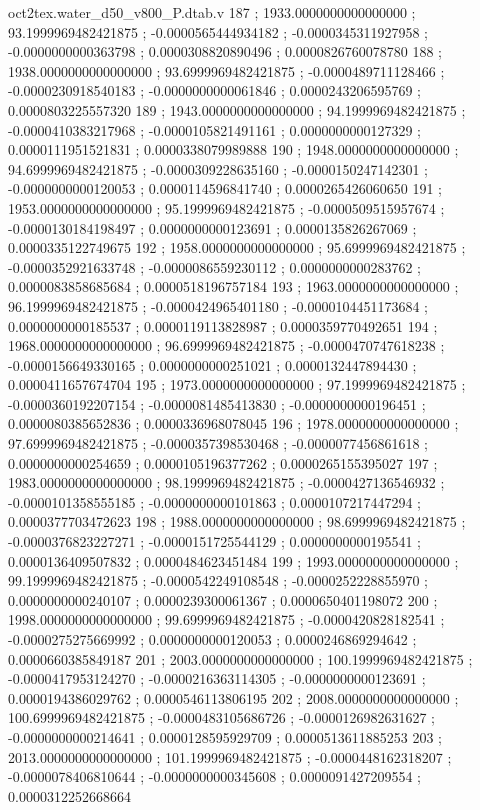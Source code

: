 \begin{filecontents}[overwrite]{oct2tex.water_d50_v800_P.dtab.v}
187 ; 1933.0000000000000000 ; 93.1999969482421875 ; -0.0000565444934182 ; -0.0000345311927958 ; -0.0000000000363798 ; 0.0000308820890496 ; 0.0000826760078780
188 ; 1938.0000000000000000 ; 93.6999969482421875 ; -0.0000489711128466 ; -0.0000230918540183 ; -0.0000000000061846 ; 0.0000243206595769 ; 0.0000803225557320
189 ; 1943.0000000000000000 ; 94.1999969482421875 ; -0.0000410383217968 ; -0.0000105821491161 ; 0.0000000000127329 ; 0.0000111951521831 ; 0.0000338079989888
190 ; 1948.0000000000000000 ; 94.6999969482421875 ; -0.0000309228635160 ; -0.0000150247142301 ; -0.0000000000120053 ; 0.0000114596841740 ; 0.0000265426060650
191 ; 1953.0000000000000000 ; 95.1999969482421875 ; -0.0000509515957674 ; -0.0000130184198497 ; 0.0000000000123691 ; 0.0000135826267069 ; 0.0000335122749675
192 ; 1958.0000000000000000 ; 95.6999969482421875 ; -0.0000352921633748 ; -0.0000086559230112 ; 0.0000000000283762 ; 0.0000083858685684 ; 0.0000518196757184
193 ; 1963.0000000000000000 ; 96.1999969482421875 ; -0.0000424965401180 ; -0.0000104451173684 ; 0.0000000000185537 ; 0.0000119113828987 ; 0.0000359770492651
194 ; 1968.0000000000000000 ; 96.6999969482421875 ; -0.0000470747618238 ; -0.0000156649330165 ; 0.0000000000251021 ; 0.0000132447894430 ; 0.0000411657674704
195 ; 1973.0000000000000000 ; 97.1999969482421875 ; -0.0000360192207154 ; -0.0000081485413830 ; -0.0000000000196451 ; 0.0000080385652836 ; 0.0000336968078045
196 ; 1978.0000000000000000 ; 97.6999969482421875 ; -0.0000357398530468 ; -0.0000077456861618 ; 0.0000000000254659 ; 0.0000105196377262 ; 0.0000265155395027
197 ; 1983.0000000000000000 ; 98.1999969482421875 ; -0.0000427136546932 ; -0.0000101358555185 ; -0.0000000000101863 ; 0.0000107217447294 ; 0.0000377703472623
198 ; 1988.0000000000000000 ; 98.6999969482421875 ; -0.0000376823227271 ; -0.0000151725544129 ; 0.0000000000195541 ; 0.0000136409507832 ; 0.0000484623451484
199 ; 1993.0000000000000000 ; 99.1999969482421875 ; -0.0000542249108548 ; -0.0000252228855970 ; 0.0000000000240107 ; 0.0000239300061367 ; 0.0000650401198072
200 ; 1998.0000000000000000 ; 99.6999969482421875 ; -0.0000420828182541 ; -0.0000275275669992 ; 0.0000000000120053 ; 0.0000246869294642 ; 0.0000660385849187
201 ; 2003.0000000000000000 ; 100.1999969482421875 ; -0.0000417953124270 ; -0.0000216363114305 ; -0.0000000000123691 ; 0.0000194386029762 ; 0.0000546113806195
202 ; 2008.0000000000000000 ; 100.6999969482421875 ; -0.0000483105686726 ; -0.0000126982631627 ; -0.0000000000214641 ; 0.0000128595929709 ; 0.0000513611885253
203 ; 2013.0000000000000000 ; 101.1999969482421875 ; -0.0000448162318207 ; -0.0000078406810644 ; -0.0000000000345608 ; 0.0000091427209554 ; 0.0000312252668664

\end{filecontents}
